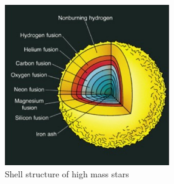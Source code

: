 \documentclass[a4paper,twoside]{report}
\numberwithin{equation}{section}
\begin{document}
\paragraph{}
\begin{figure}
\includegraphics[width=1.0\linewidth, height=7cm]{star_shell.jpg}
\caption{Shell structure of high mass stars}
\label{Star_shell}
\end{figure}
\end{document}
